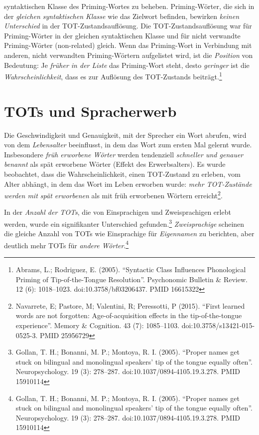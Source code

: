 \documentclass[
  letterpaper,
]{scrbook}
\begin{document}
syntaktischen Klasse des Priming-Wortes zu beheben. Priming-Wörter, die
sich in der \emph{gleichen syntaktischen Klasse} wie das Zielwort
befinden, bewirken \emph{keinen Unterschied} in der
TOT-Zustandsauflösung. Die TOT-Zustandsauflösung war für Priming-Wörter
in der gleichen syntaktischen Klasse und für nicht verwandte
Priming-Wörter (non-related) gleich. Wenn das Priming-Wort in Verbindung
mit anderen, nicht verwandten Priming-Wörtern aufgelistet wird, ist die
\emph{Position} von Bedeutung: Je \emph{früher in der Liste} das
Priming-Wort steht, desto \emph{geringer} ist die
\emph{Wahrscheinlichkeit}, dass es zur Auflösung des TOT-Zustands
beiträgt.\footnote{Abrams, L.; Rodriguez, E. (2005). ``Syntactic Class
  Influences Phonological Priming of Tip-of-the-Tongue Resolution''.
  Psychonomic Bulletin \& Review. 12 (6): 1018--1023.
  doi:10.3758/bf03206437. PMID 16615322}

\hypertarget{tots-und-spracherwerb}{%
\section{TOTs und Spracherwerb}\label{tots-und-spracherwerb}}

Die Geschwindigkeit und Genauigkeit, mit der Sprecher ein Wort abrufen,
wird von dem \emph{Lebensalter} beeinflusst, in dem das Wort zum ersten
Mal gelernt wurde. Insbesondere \emph{früh erworbene Wörter} werden
tendenziell \emph{schneller und genauer benannt} als spät erworbene
Wörter (Effekt des Erwerbsalters). Es wurde beobachtet, dass die
Wahrscheinlichkeit, einen TOT-Zustand zu erleben, vom Alter abhängt, in
dem das Wort im Leben erworben wurde: \emph{mehr TOT-Zustände werden mit
spät erworbenen} als mit früh erworbenen Wörtern erreicht\footnote{Navarrete,
  E; Pastore, M; Valentini, R; Peressotti, P (2015). ``First learned
  words are not forgotten: Age-of-acquisition effects in the
  tip-of-the-tongue experience''. Memory \& Cognition. 43 (7):
  1085--1103. doi:10.3758/s13421-015-0525-3. PMID 25956729}.

In der \emph{Anzahl der TOTs}, die von Einsprachigen und Zweisprachigen
erlebt werden, wurde ein signifikanter Unterschied gefunden.\footnote{Gollan,
  T. H.; Bonanni, M. P.; Montoya, R. I. (2005). ``Proper names get stuck
  on bilingual and monolingual speakers' tip of the tongue equally
  often''. Neuropsychology. 19 (3): 278--287.
  doi:10.1037/0894-4105.19.3.278. PMID 15910114} \emph{Zweisprachige}
scheinen die gleiche Anzahl von TOTs wie Einsprachige für
\emph{Eigennamen} zu berichten, aber deutlich mehr TOTs für \emph{andere
Wörter}.\footnote{Gollan, T. H.; Bonanni, M. P.; Montoya, R. I. (2005).
  ``Proper names get stuck on bilingual and monolingual speakers' tip of
  the tongue equally often''. Neuropsychology. 19 (3): 278--287.
  doi:10.1037/0894-4105.19.3.278. PMID 15910114}
\end{document}
